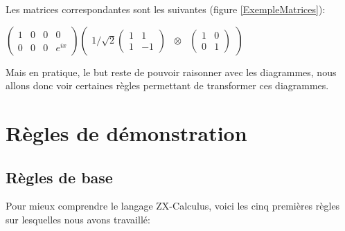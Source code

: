 \documentclass[a4paper,oneside]{book}
\begin{document}
Les matrices correspondantes sont les suivantes (figure \ref{ExempleMatrices}):

\begin{center}
\begin{minipage}[c]{0.4\textwidth}
$
\begin{pmatrix}
1 & 0 & 0 & 0 \\
0 & 0 & 0 & e^{ix}
\end{pmatrix}
\begin{pmatrix}
1/ \sqrt{2}
\begin{pmatrix}
1 & 1 \\
1 & -1
\end{pmatrix} %
& \otimes & %
\begin{pmatrix}
1 & 0 \\
0 & 1
\end{pmatrix}
\end{pmatrix}
$
\end{minipage}
\label{ExempleMatrices}
\end{center}

Mais en pratique, le but reste de pouvoir raisonner avec les diagrammes, nous allons donc voir certaines règles permettant de transformer ces diagrammes.

\section{Règles de démonstration}
\subsection{Règles de base}
Pour mieux comprendre le langage ZX-Calculus, voici les cinq premières règles sur lesquelles nous avons travaillé:
\end{document}
